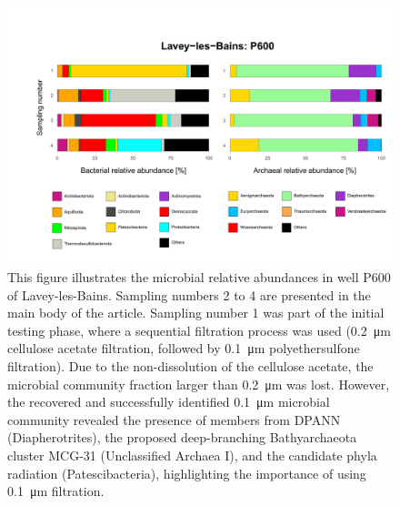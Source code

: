 \newpage
\null
\vfill
\begin{figure}[H]
\centering
\includegraphics[width=\textwidth]{chapters/06_appendix/SI_C2/phylum_test_Lavey.pdf}
\caption{
This figure illustrates the microbial relative abundances in well P600 of Lavey-les-Bains.
Sampling numbers 2 to 4 are presented in the main body of the article.
Sampling number 1 was part of the initial testing phase, where a sequential filtration process was used (\SI{0.2}{\micro\metre} cellulose acetate filtration, followed by \SI{0.1}{\micro\metre} polyethersulfone filtration).
Due to the non-dissolution of the cellulose acetate, the microbial community fraction larger than \SI{0.2}{\micro\metre} was lost.
However, the recovered and successfully identified \SI{0.1}{\micro\metre} microbial community revealed the presence of members from DPANN (Diapherotrites), the proposed deep-branching Bathyarchaeota cluster MCG-31 (Unclassified Archaea I), and the candidate phyla radiation (Patescibacteria), highlighting the importance of using \SI{0.1}{\micro\metre} filtration.
}
\label{figSI:filter_comp}
\end{figure}
\vfill 

\newpage

